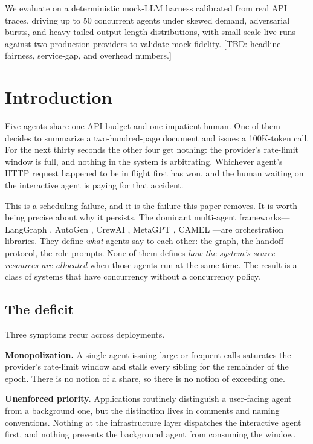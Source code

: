 \documentclass[letterpaper,11pt,leqno]{article}
\begin{document}
\begin{titlepage}
We evaluate on a deterministic mock-LLM harness calibrated from real API traces, driving up to 50 concurrent agents under skewed demand, adversarial bursts, and heavy-tailed output-length distributions, with small-scale live runs against two production providers to validate mock fidelity. {[}TBD: headline fairness, service-gap, and overhead numbers.{]}

\end{titlepage}

\section{Introduction}\label{s:introduction}

Five agents share one API budget and one impatient human. One of them decides to summarize a two-hundred-page document and issues a 100K-token call. For the next thirty seconds the other four get nothing: the provider's rate-limit window is full, and nothing in the system is arbitrating. Whichever agent's HTTP request happened to be in flight first has won, and the human waiting on the interactive agent is paying for that accident.

This is a scheduling failure, and it is the failure this paper removes. It is worth being precise about why it persists. The dominant multi-agent frameworks---LangGraph \citep{LangChain24}, AutoGen \citep{Wu23}, CrewAI \citep{CrewAI24}, MetaGPT \citep{Hong24}, CAMEL \citep{Li23}---are orchestration libraries. They define \emph{what} agents say to each other: the graph, the handoff protocol, the role prompts. None of them defines \emph{how the system's scarce resources are allocated} when those agents run at the same time. The result is a class of systems that have concurrency without a concurrency policy.

\subsection{The deficit}\label{s:deficit}

Three symptoms recur across deployments.

\textbf{Monopolization.} A single agent issuing large or frequent calls saturates the provider's rate-limit window and stalls every sibling for the remainder of the epoch. There is no notion of a share, so there is no notion of exceeding one.

\textbf{Unenforced priority.} Applications routinely distinguish a user-facing agent from a background one, but the distinction lives in comments and naming conventions. Nothing at the infrastructure layer dispatches the interactive agent first, and nothing prevents the background agent from consuming the window.
\end{document}

